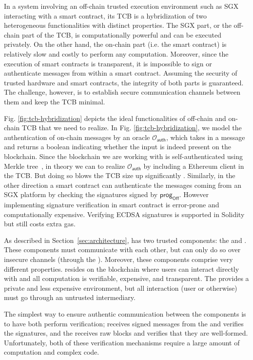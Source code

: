 In a system involving an off-chain trusted execution environment such as SGX
interacting with a smart contract, its TCB is a hybridization of two
heterogeneous functionalities with distinct properties.  The SGX part, or the
off-chain part of the TCB, is computationally powerful and can be executed
privately. On the other hand, the on-chain part (i.e. the smart contract) is
relatively slow and costly to perform any computation. Moreover, since the
execution of smart contracts is transparent, it is impossible to sign or
authenticate messages from within a smart contract.  Assuming the security of
trusted hardware and smart contracts, the integrity of both parts is guaranteed.
The challenge, however, is to establish secure communication channels between them
and keep the TCB minimal. 

Fig. \ref{fig:tcb-hybridization} depicts the
ideal functionalities of off-chain and on-chain TCB that we need to realize.
In Fig. \ref{fig:tcb-hybridization}, we model the authentication of on-chain
messages by an oracle $\mathcal{O}_\textsf{auth}$, which takes in a message
and returns a boolean indicating whether the input is indeed present on the
blockchain. 
Since the blockchain we are working with is self-authenticated using Merkle
tree~, in theory we can to realize $\mathcal{O}_\textsf{auth}$
by including a Ethereum client in the TCB. But doing so blows the TCB size up 
significantly .
Similarly, in the other direction a smart contract can
authenticate the messages coming from an SGX platform by checking the
signatures signed by $\textsf{prog}_\textsf{Off}$. However implementing
signature verification in smart contract is error-prone and 
computationally expensive. Verifying ECDSA signatures
is supported in Solidity  but still costs extra gas.


As described in Section~\ref{sec:architecture}, \tc has two trusted components: the \encname and \tcont.
These components must communicate with each other, but can only do so over insecure channels (through the \medname).
Moreover, these components comprise very different properties.
\tcont resides on the blockchain where users can interact directly with \tc and all computation is verifiable, expensive, and transparent.
The \encname provides a private and less expensive environment, but all interaction (user or otherwise) must go through an untrusted intermediary.

The simplest way to ensure authentic communication between the components is to have both perform verification;
\tcont receives signed messages from the \encname and verifies the signatures,
and the \encname receives raw blocks and verifies that they are well-formed.
Unfortunately, both of these verification mechanisms require a large amount of computation and complex code.

